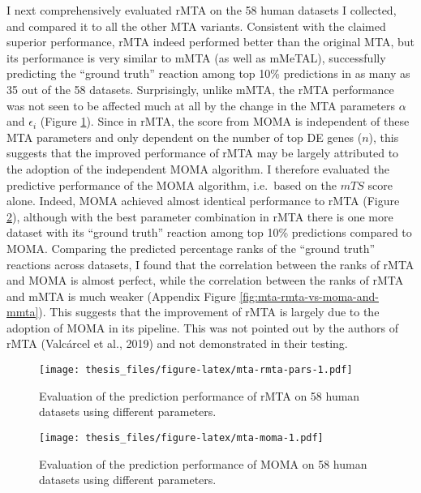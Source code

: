 \documentclass[12pt,twoside,openany,\mydriver]{thesis}  %
\begin{document}
I next comprehensively evaluated rMTA on the 58 human datasets I collected, and compared it to all the other MTA variants. Consistent with the claimed superior performance, rMTA indeed performed better than the original MTA, but its performance is very similar to mMTA (as well as mMeTAL), successfully predicting the ``ground truth'' reaction among top 10\% predictions in as many as 35 out of the 58 datasets. Surprisingly, unlike mMTA, the rMTA performance was not seen to be affected much at all by the change in the MTA parameters \(\alpha\) and \(\epsilon_i\) (Figure \ref{fig:mta-rmta-pars}). Since in rMTA, the score from MOMA is independent of these MTA parameters and only dependent on the number of top DE genes (\(n\)), this suggests that the improved performance of rMTA may be largely attributed to the adoption of the independent MOMA algorithm. I therefore evaluated the predictive performance of the MOMA algorithm, i.e.~based on the \(mTS\) score alone. Indeed, MOMA achieved almost identical performance to rMTA (Figure \ref{fig:mta-moma}), although with the best parameter combination in rMTA there is one more dataset with its ``ground truth'' reaction among top 10\% predictions compared to MOMA. Comparing the predicted percentage ranks of the ``ground truth'' reactions across datasets, I found that the correlation between the ranks of rMTA and MOMA is almost perfect, while the correlation between the ranks of rMTA and mMTA is much weaker (Appendix Figure \ref{fig:mta-rmta-vs-moma-and-mmta}). This suggests that the improvement of rMTA is largely due to the adoption of MOMA in its pipeline. This was not pointed out by the authors of rMTA (Valcárcel et al., 2019) and not demonstrated in their testing.
\begin{figure}
\centering
\texttt{[image: thesis\_files/figure-latex/mta-rmta-pars-1.pdf]}
\caption{\label{fig:mta-rmta-pars}Evaluation of the prediction performance of rMTA on 58 human datasets using different parameters.}
\end{figure}
\begin{figure}
\centering
\texttt{[image: thesis\_files/figure-latex/mta-moma-1.pdf]}
\caption{\label{fig:mta-moma}Evaluation of the prediction performance of MOMA on 58 human datasets using different parameters.}
\end{figure}
\end{document}
